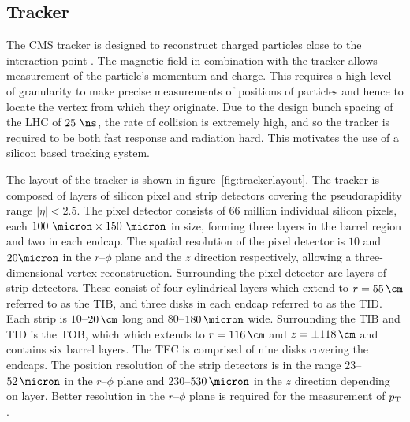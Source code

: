 

\subsection{Tracker}
\label{sec:tracker}

The CMS tracker is designed to reconstruct charged particles close to the
interaction point \cite{Chatrchyan:2008aa}. The magnetic field in combination with the tracker allows
measurement of the particle's momentum and charge. This requires a high level of
granularity to make precise measurements of positions of particles and hence to
locate the vertex from which they originate. Due to the design bunch spacing
of the LHC of $25~\ns$, the rate of collision is extremely high, and so the tracker is
required to be both fast response and radiation hard. This motivates the use of a
silicon based tracking system.

The layout of the tracker is shown in figure~\ref{fig:trackerlayout}.
The tracker is composed of layers of silicon pixel and strip detectors covering
the pseudorapidity range $|\eta| < 2.5$. The pixel detector consists of 66
million individual silicon pixels, each $100~\micron \times 150~\micron$
in size, forming three layers in the barrel region and two in each endcap. The
spatial resolution of the pixel detector is $10$ and $20\micron$ in the $r$--$\phi$ plane
and the $z$ direction respectively, allowing a three-dimensional vertex reconstruction.
Surrounding the pixel detector are layers of strip detectors. These consist of
four cylindrical layers which extend to $r=55\,\cm$ referred to as the
\ac{TIB}, and three disks in each endcap referred to as the \ac{TID}. Each strip
is $10$--$20\,\cm$ long and $80$--$180\,\micron$ wide. Surrounding the \ac{TIB}
and \ac{TID} is the \ac{TOB}, which which extends to $r=116\,\cm$ and
$z=\pm118\,\cm$ and contains six barrel layers. The \ac{TEC} is comprised of nine
disks covering the endcaps. The position resolution of the strip detectors is in
the range $23$--$52\,\micron$ in the $r$--$\phi$ plane and $230$--$530\,\micron$
in the $z$ direction depending on layer. Better resolution in the $r$--$\phi$
plane is required for the measurement of $p_{\mathrm{T}}$.

